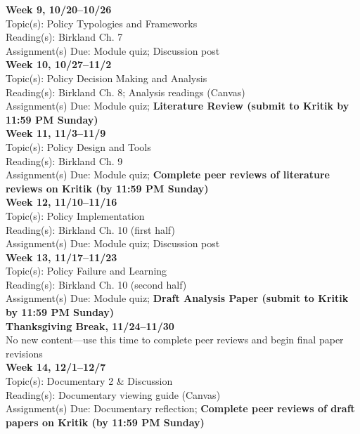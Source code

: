 \documentclass[12pt]{article}     %
\begin{document}
\noindent \textbf{Week 9, 10/20--10/26}\\
Topic(s): Policy Typologies and Frameworks\\
Reading(s): Birkland Ch. 7\\
Assignment(s) Due: Module quiz; Discussion post\\

\noindent \textbf{Week 10, 10/27--11/2}\\
Topic(s): Policy Decision Making and Analysis\\
Reading(s): Birkland Ch. 8; Analysis readings (Canvas)\\
Assignment(s) Due: Module quiz; \textbf{Literature Review (submit to Kritik by 11:59 PM Sunday)}\\

\noindent \textbf{Week 11, 11/3--11/9}\\
Topic(s): Policy Design and Tools\\
Reading(s): Birkland Ch. 9\\
Assignment(s) Due: Module quiz; \textbf{Complete peer reviews of literature reviews on Kritik (by 11:59 PM Sunday)}\\

\noindent \textbf{Week 12, 11/10--11/16}\\
Topic(s): Policy Implementation\\
Reading(s): Birkland Ch. 10 (first half)\\
Assignment(s) Due: Module quiz; Discussion post\\

\noindent \textbf{Week 13, 11/17--11/23}\\
Topic(s): Policy Failure and Learning\\
Reading(s): Birkland Ch. 10 (second half)\\
Assignment(s) Due: Module quiz; \textbf{Draft Analysis Paper (submit to Kritik by 11:59 PM Sunday)}\\

\noindent \textbf{Thanksgiving Break, 11/24--11/30}\\
No new content---use this time to complete peer reviews and begin final paper revisions\\

\noindent \textbf{Week 14, 12/1--12/7}\\
Topic(s): Documentary 2 \& Discussion\\
Reading(s): Documentary viewing guide (Canvas)\\
Assignment(s) Due: Documentary reflection; \textbf{Complete peer reviews of draft papers on Kritik (by 11:59 PM Sunday)}\\
\end{document}
